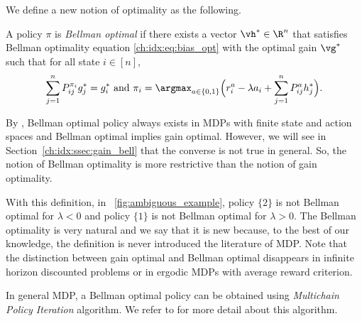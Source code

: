 


We define a new notion of optimality as the following.
\begin{defn}
    \label{ch:idx:defn:bell}
    A policy $\pi$ is \emph{Bellman optimal} if there exists a vector $\vh^*\in\R^n$ that satisfies Bellman optimality equation \eqref{ch:idx:eq:bias_opt} with the optimal gain $\vg^*$ such that for all state $i\in[n]$,
    \begin{equation}
        \label{ch:idx:eq:bell}
        \sum_{j=1}^nP^{\pi_i}_{ij}g^*_j =g^*_i \text{ and } \pi_i=\argmax_{a\in\{0,1\}} \Big(r^{a}_i - \lambda a_i + \sum_{j=1}^n P^{a}_{ij}h^*_j\Big).
    \end{equation}
\end{defn}
By \cite[Theorem~9.1.7]{puterman2014markov}, Bellman optimal policy always exists in MDPs with finite state and action spaces and Bellman optimal implies gain optimal.
However, we will see in Section~\ref{ch:idx:ssec:gain_bell} that the converse is not true in general.
So, the notion of Bellman optimality is more restrictive than the notion of gain optimality.

With this definition, in \figurename~\ref{fig:ambiguous_example}, policy $\{2\}$ is not Bellman optimal for $\lambda<0$ and policy $\{1\}$ is not Bellman optimal for $\lambda>0$.
The Bellman optimality is very natural and we say that it is new because, to the best of our knowledge, the definition is never introduced the literature of MDP.
Note that the distinction between gain optimal and Bellman optimal disappears in infinite horizon discounted problems or in ergodic MDPs with average reward criterion.

In general MDP, a Bellman optimal policy can be obtained using \emph{Multichain Policy Iteration} algorithm.
We refer to \cite[Section~9.2.1]{puterman2014markov} for more detail about this algorithm.

